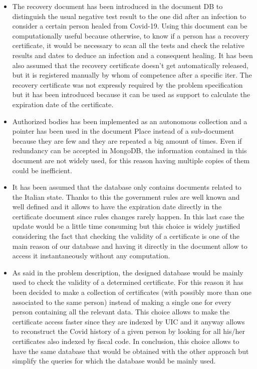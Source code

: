 \documentclass{article}
\begin{document}
\begin{itemize}

\item The recovery document has been introduced in the document DB to distinguish the usual negative test result to the one did after an infection to consider a certain person healed from Covid-19. Using this document can be computationally useful because otherwise, to know if a person has a recovery certificate, it would be necessary to scan all the tests and check the relative results and dates to deduce an infection and a consequent healing. It has been also assumed that the recovery certificate doesn't get automatically released, but it is registered manually by whom of competence after a specific iter. The recovery certificate was not expressly required by the problem specification but it has been introduced because it can be used as support to calculate the expiration date of the certificate.
\item Authorized bodies has been implemented as an autonomous collection and a pointer has been used in the document Place instead of a sub-document because they are few and they are repeated a big amount of times. Even if redundancy can be accepted in MongoDB, the information contained in this document are not widely used, for this reason having multiple copies of them could be inefficient.
\item It has been assumed that the database only contains documents related to the Italian state. Thanks to this the government rules are well known and well defined and it allows to have the expiration date directly in the certificate document since rules changes rarely happen. In this last case the update would be a little time consuming but this choice is widely justified considering the fact that checking the validity of a certificate is one of the main reason of our database and having it directly in the document allow to access it instantaneously without any computation.
\item As said in the problem description, the designed database would be mainly used to check the validity of a determined certificate. For this reason it has been decided to make a collection of certificates (with possibly more than one associated to the same person) instead of making a single one for every person containing all the relevant data. This choice allows to make the certificate access faster since they are indexed by UIC and it anyway allows to reconstruct the Covid history of a given person by looking for all his/her certificates also indexed by fiscal code. In conclusion, this choice allows to have the same database that would be obtained with the other approach but simplify the queries for which the database would be mainly used.

\end{itemize}
\end{document}

